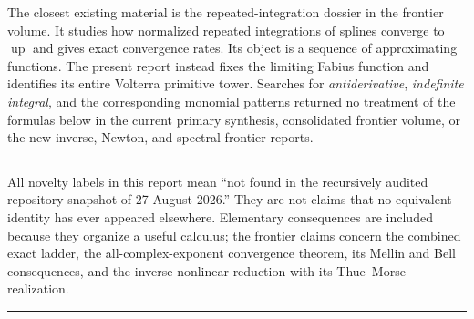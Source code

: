 \documentclass[11pt,oneside]{article}
\numberwithin{equation}{section}
\theoremstyle{definition}
\theoremstyle{remark}
\newcommand{\Up}{\operatorname{up}}
\newenvironment{boxedremark}{%
  \par\smallskip\noindent\begin{center}\begin{minipage}{0.94\textwidth}%
  \color{black}\hrule\vspace{0.6em}\small
}{%
  \vspace{0.6em}\hrule\end{minipage}\end{center}\smallskip
}
\begin{document}
The closest existing material is the repeated-integration dossier in the
frontier volume.  It studies how normalized repeated integrations of splines
converge to $\Up$ and gives exact convergence rates.  Its object is a sequence
of approximating functions.  The present report instead fixes the limiting
Fabius function and identifies its entire Volterra primitive tower.  Searches
for \emph{antiderivative}, \emph{indefinite integral}, and the corresponding
monomial patterns returned no treatment of the formulas below in the current
primary synthesis, consolidated frontier volume, or the new inverse, Newton,
and spectral frontier reports.

\begin{boxedremark}
All novelty labels in this report mean ``not found in the recursively audited
repository snapshot of 27 August 2026.''  They are not claims that no equivalent
identity has ever appeared elsewhere.  Elementary consequences are included
because they organize a useful calculus; the frontier claims concern the
combined exact ladder, the all-complex-exponent convergence theorem, its Mellin
and Bell consequences, and the inverse nonlinear reduction with its
Thue--Morse realization.
\end{boxedremark}
\end{document}
